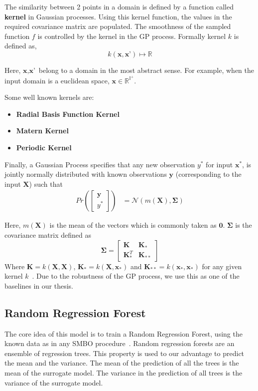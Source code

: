 \documentclass[12pt, twoside, ngerman]{report}
\begin{document}
The similarity between 2 points in a domain is defined by a function called \textbf{kernel} in Gaussian processes.
Using this kernel function, the values in the required covariance matrix are populated.
The smoothness of the sampled function $f$ is controlled by the kernel in the GP process.
Formally kernel $k$ is defined as,
$$
k(\textbf{x}, \textbf{x'}) \mapsto \mathbb{R}
$$

Here, $\textbf{x}, \textbf{x'}$ belong to a domain in the most abstract sense.
For example,  when the input domain is a euclidean space,  $\textbf{x} \in \mathbb{R}^{\mathbb{I}^+}$.

Some well known kernels are:
\begin{itemize}
\item \textbf{Radial Basis Function Kernel}
\item \textbf{Matern Kernel}
\item \textbf{Periodic Kernel}
\end{itemize}

Finally,  a Gaussian Process specifies that any new observation $y^*$ for input $\textbf{x}^*$,  is jointly normally distributed with known observations $\textbf{y}$ (corresponding to the input $\textbf{X}$) such that
\begin{align}
    Pr\left( \begin{bmatrix}
           \textbf{y} \\
           y^*
         \end{bmatrix}
         \right)
         &=  \mathcal{N}\left(m(\textbf{X}), \mathbf{\Sigma}\right)
\end{align}

Here, $m(\textbf{X})$ is the mean of the vectors which is commonly taken as $\textbf{0}$.
$\mathbf{\Sigma}$ is the covariance matrix defined as
$$
\mathbf{\Sigma} = \begin{bmatrix}
           \textbf{K} & \textbf{K}_* \\
           \textbf{K}_*^T & \textbf{K}_{**}
         \end{bmatrix}
$$
  Where $\textbf{K} = k(\textbf{X}, \textbf{X})$,  $\textbf{K}_*  =  k(\textbf{X}, \textbf{x}_*)$ and $\textbf{K}_{**} = k(\textbf{x}_*,  \textbf{x}_*)$ for any given kernel $k$~\cite{GPTutorial}.
  Due to the robustness of the GP process, we use this as one of the baselines in our thesis.

\subsection{Random Regression Forest}
     The core idea of this model is to train a Random Regression Forest, using the known data as in any SMBO procedure~\cite{SMBOPaper}.
Random regression forests are an ensemble of regression trees. 
This property is used to our advantage to predict the mean and the variance. 
The mean of the prediction of all the trees is the mean of the surrogate model.
The variance in the prediction of all trees is the variance of the surrogate model.
\end{document}
